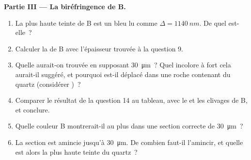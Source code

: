 \begin{problem}
\medskip
\noindent\textbf{Partie III --- La biréfringence de B.}
\begin{enumerate}[resume]
  \item La plus haute teinte de B est un bleu lu comme $\Delta = \qty{1140}{nm}$.
        De quel  est-elle~?
  \item Calculer la  de B avec l'épaisseur trouvée à la question 9.
  \item Quelle  aurait-on trouvée en supposant \qty{30}{\micro m}~?
        Quel  incolore à  fort cela aurait-il suggéré, et pourquoi
        est-il déplacé dans une roche contenant du quartz (considérer
        )~?
  \item Comparer le résultat de la question 14 au tableau, avec le  et les
        clivages de B, et conclure.
  \item Quelle couleur B montrerait-il au plus dans une section correcte de
        \qty{30}{\micro m}~?
  \item La section est amincie jusqu'à \qty{30}{\micro m}. De combien faut-il
        l'amincir, et quelle est alors la plus haute teinte du quartz~?
\end{enumerate}


\end{problem}
